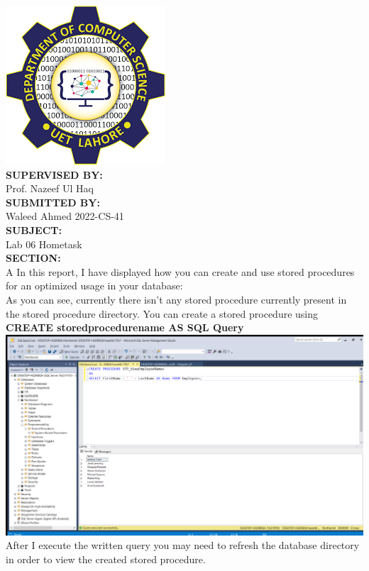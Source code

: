 \documentclass{article}
\begin{document}
\begin{center}
    \includegraphics[]{Logo.png} \\
    \Large \textbf{SUPERVISED BY:} \\
     Prof. Nazeef Ul Haq \\
    \textbf{SUBMITTED BY:} \\
    Waleed Ahmed 2022-CS-41 \\
    \textbf{SUBJECT:} \\
    Lab 06 Hometask \\
    \textbf{SECTION:} \\
    A
    \newpage
    In this report, I have displayed how you can create and use stored procedures for an optimized usage in your database: \\
    As you can see, currently there isn't any stored procedure currently present in the stored procedure directory. You can create a stored procedure using \textbf{CREATE storedprocedurename AS SQL Query} \\
    \includegraphics[width=1\textwidth]{1.png} \\
    \newpage
    After I execute the written query you may need to refresh the database directory in order to view the created stored procedure. \\

\end{center}
\end{document}
